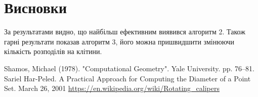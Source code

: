 \documentclass[a4paper,12pt]{article}
\begin{document}
\section{Висновки}

За результатами видно, що найбільш ефективним виявився алгоритм 2. Також гарні результати показав алгоритм 3, його можна пришвидшити змінюючи кількість розподілів на клітини. 


\begin{thebibliography}{}
	 Shamos, Michael (1978). "Computational Geometry". Yale University. pp. 76–81.
	 Sariel Har-Peled. A Practical Approach for Computing the Diameter of a
	Point Set. March 26, 2001
	\bibitem{} \href{https://en.wikipedia.org/wiki/Rotating_calipers}{https://en.wikipedia.org/wiki/Rotating\_calipers}
\end{thebibliography}
\end{document}
